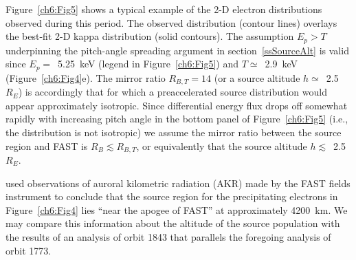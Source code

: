 
  Figure~\ref{ch6:Fig5} \DIFaddbegin {}\DIFaddend shows a typical example of the 2-D electron distributions observed
  during this period. The observed distribution (contour lines) overlays the
  best-fit 2-D kappa distribution (solid contours). The assumption $E_p > T$
  underpinning the pitch-angle spreading argument in section~\ref{ssSourceAlt}
  is valid since $E_p =$~5.25~keV (legend in Figure~\ref{ch6:Fig5}) and
  $T \simeq$~2.9~keV (Figure~\ref{ch6:Fig4}e). The mirror ratio $R_{B,T} = 14$
  (or a source altitude $h \simeq$~2.5~$R_E$) is accordingly that for which a
  preaccelerated source distribution would appear approximately isotropic. Since
  differential energy flux drops off somewhat rapidly with increasing pitch
  angle in the bottom panel of Figure~\ref{ch6:Fig5} (i.e., the distribution is
  not isotropic) we assume the mirror ratio between the source region and FAST
  is $R_B \lesssim R_{B,T}$, or equivalently that the source altitude
  $h \lesssim$~2.5~$R_E$.

  \citet{Ergun1998} used observations of auroral kilometric radiation (AKR) made
  by the FAST fields instrument \citep{Ergun2001} to conclude that the source
  region for the precipitating electrons in Figure~\ref{ch6:Fig4} lies ``near
  the apogee of FAST'' at approximately 4200~km. We may compare this information
  about the altitude of the source population with the results of an analysis of
  orbit 1843 that parallels the foregoing analysis of orbit 1773.


